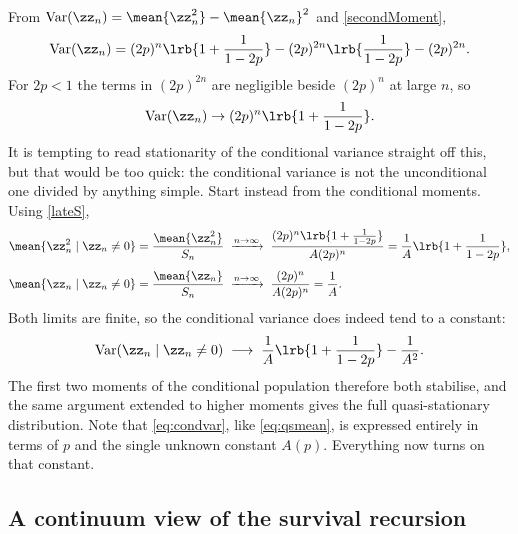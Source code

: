 From $\text{Var}(\zz_n) = \mean{\zz_n^2}-\mean{\zz_n}^2$ and \cref{secondMoment},
\begin{equation*}
\text{Var}(\zz_n) = (2p)^n\lrb{1 + \frac{1}{1-2p}} - (2p)^{2n}\lrb{\frac{1}{1-2p}} - (2p)^{2n}.
\end{equation*}
For $2p<1$ the terms in $(2p)^{2n}$ are negligible beside $(2p)^n$ at large $n$, so
\begin{equation*}
\text{Var}(\zz_n) \to (2p)^n\lrb{1 + \frac{1}{1-2p}}.
\end{equation*}
It is tempting to read stationarity of the conditional variance straight off this,
but that would be too quick: the conditional variance is not the unconditional one
divided by anything simple. Start instead from the conditional moments. Using
\cref{lateS},
\begin{align*}
\mean{\zz_n^2\mid \zz_n\neq0} &= \frac{\mean{\zz_n^2}}{S_n}
\;\xrightarrow{n\to\infty}\;
\frac{(2p)^n\lrb{1+\frac{1}{1-2p}}}{A(2p)^n} = \frac{1}{A}\lrb{1+\frac{1}{1-2p}},\\[4pt]
\mean{\zz_n\mid \zz_n\neq0} &= \frac{\mean{\zz_n}}{S_n}
\;\xrightarrow{n\to\infty}\;
\frac{(2p)^n}{A(2p)^n} = \frac{1}{A}.
\end{align*}
Both limits are finite, so the conditional variance does indeed tend to a constant:
\begin{equation}
\label{eq:condvar}
\text{Var}(\zz_n\mid \zz_n\neq0) \;\longrightarrow\; \frac{1}{A}\lrb{1+\frac{1}{1-2p}} - \frac{1}{A^2}.
\end{equation}
The first two moments of the conditional population therefore both stabilise, and
the same argument extended to higher moments gives the full quasi-stationary
distribution. Note that \cref{eq:condvar}, like \cref{eq:qsmean}, is expressed
entirely in terms of $p$ and the single unknown constant $A(p)$. Everything now
turns on that constant.

\subsection{A continuum view of the survival recursion}
\label{sec:riccati}


